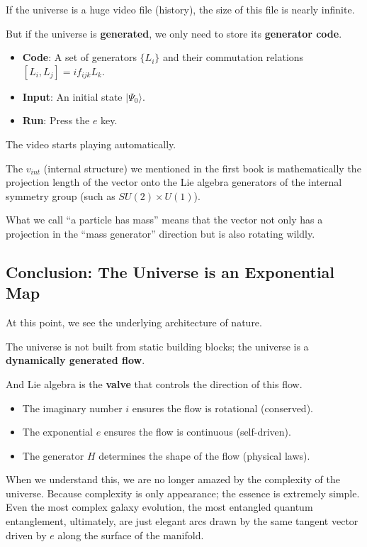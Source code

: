 \documentclass[11pt,a4paper,twoside]{book}
\begin{document}
If the universe is a huge video file (history), the size of this file is nearly infinite.

But if the universe is \textbf{generated}, we only need to store its \textbf{generator code}.

\begin{itemize}
\item \textbf{Code}: A set of generators $\{L_i\}$ and their commutation relations $[L_i, L_j] = i f_{ijk} L_k$.

\item \textbf{Input}: An initial state $|\Psi_0\rangle$.

\item \textbf{Run}: Press the $e$ key.
\end{itemize}

The video starts playing automatically.

The $v_{int}$ (internal structure) we mentioned in the first book is mathematically the projection length of the vector onto the Lie algebra generators of the internal symmetry group (such as $SU(2) \times U(1)$).

What we call ``a particle has mass'' means that the vector not only has a projection in the ``mass generator'' direction but is also rotating wildly.

\subsection{Conclusion: The Universe is an Exponential Map}

At this point, we see the underlying architecture of nature.

The universe is not built from static building blocks; the universe is a \textbf{dynamically generated flow}.

And Lie algebra is the \textbf{valve} that controls the direction of this flow.

\begin{itemize}
\item The imaginary number $i$ ensures the flow is rotational (conserved).

\item The exponential $e$ ensures the flow is continuous (self-driven).

\item The generator $H$ determines the shape of the flow (physical laws).
\end{itemize}

When we understand this, we are no longer amazed by the complexity of the universe. Because complexity is only appearance; the essence is extremely simple. Even the most complex galaxy evolution, the most entangled quantum entanglement, ultimately, are just elegant arcs drawn by the same tangent vector driven by $e$ along the surface of the manifold.
\end{document}
